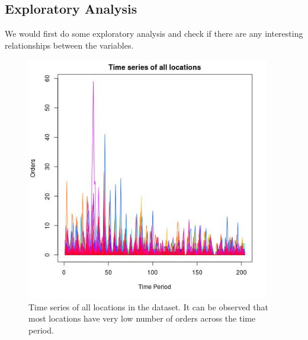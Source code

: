 \documentclass[12pt, letterpaper] {article}
\begin{document}
\subsection{Exploratory Analysis}
We would first do some exploratory analysis and check if there are any interesting relationships between the variables. 

\begin{figure}[H]
    \centering
    \includegraphics[width=0.95\textwidth, height=0.7\textheight]{Images/example_all_ts.jpg}
    \caption{Time series of all locations in the dataset. It can be observed that most locations have very low number of orders across the time period.}
    \label{fig:Time series of all locations in the dataset. It can be observed that most locations have very low number of orders across the time period.}
\end{figure}
\end{document}
